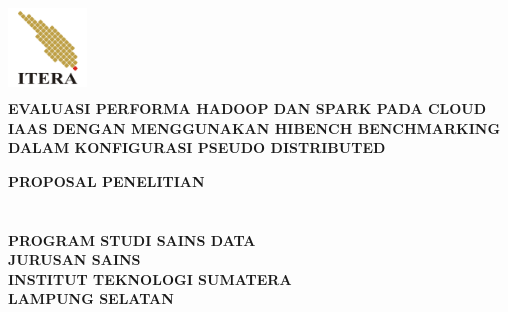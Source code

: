 \begin{titlepage}
\begin{center}
\includegraphics[height=2.5cm, width=2.1cm]{LogoITERA.png}\\[5ex]
\textbf{\fontsize{14pt}{0}\selectfont EVALUASI PERFORMA HADOOP DAN SPARK PADA CLOUD IAAS DENGAN MENGGUNAKAN HIBENCH BENCHMARKING DALAM KONFIGURASI PSEUDO DISTRIBUTED}\\
\vspace{3cm}

\textbf{\fontsize{14pt}{0}\selectfont  PROPOSAL PENELITIAN}\\[18ex]
\textbf{\fontsize{12pt}{0}\selectfont{Dimas Wahyu Saputro}}\\ 
\textbf{\fontsize{12pt}{0}\selectfont{120450081}}\\[20ex]
\textbf{\fontsize{12pt}{0}\selectfont PROGRAM STUDI SAINS DATA}\\
\textbf{\fontsize{12pt}{0}\selectfont JURUSAN SAINS}\\
\textbf{\fontsize{12pt}{0}\selectfont INSTITUT TEKNOLOGI SUMATERA}\\
\textbf{\fontsize{12pt}{0}\selectfont LAMPUNG SELATAN}\\
\textbf{\fontsize{12pt}{0}}\\
\vspace{3cm}
\end{center}
\end{titlepage}